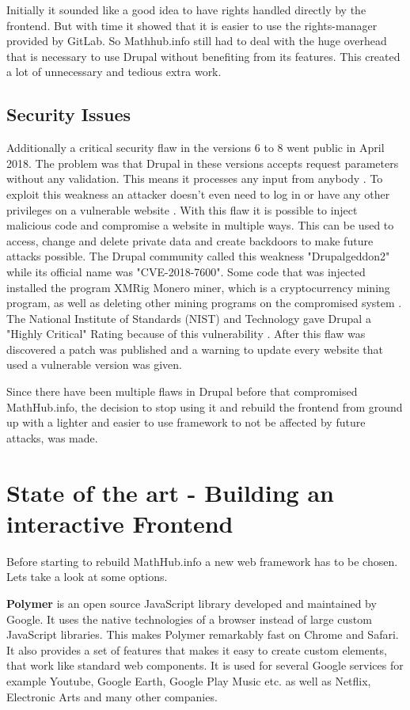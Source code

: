 \documentclass[11pt,a4paper]{article}
\begin{document}
Initially it sounded like a good idea to have rights handled directly by the frontend.
But with time it showed that it is easier to use the rights-manager provided by GitLab.
So Mathhub.info still had to deal with the huge overhead that is necessary to use Drupal without benefiting from its features.
This created a lot of unnecessary and tedious extra work.	

\subsection{Security Issues} \label{security}
Additionally a critical security flaw in the versions 6 to 8 went public in April 2018.
The problem was that Drupal in these versions accepts request parameters without any validation.
This means it processes any input from anybody \cite{zdnet}.
To exploit this weakness an attacker doesn't even need to log in or have any other privileges on a vulnerable website \cite{register}.
With this flaw it is possible to inject malicious code and compromise a website in multiple ways.
This can be used to access, change and delete private data and create backdoors to make future attacks possible.
The Drupal community called this weakness "Drupalgeddon2" while its official name was "CVE-2018-7600".
Some code that was injected installed the program XMRig Monero miner, which is a cryptocurrency mining program, as well as deleting other mining programs on the compromised system \cite{hacker}.
The National Institute of Standards (NIST) and Technology gave Drupal a "Highly Critical" Rating because of this vulnerability \cite{nist}.
 After this flaw was discovered a patch was published and a warning to update every website that used a vulnerable version was given.
	
Since there have been multiple flaws in Drupal before that compromised MathHub.info, the decision to stop using it and rebuild the frontend from ground up with a lighter and easier to use framework to not be affected by future attacks, was made.

\section{State of the art - Building an interactive Frontend} \label{SoA}
Before starting to rebuild MathHub.info a new web framework has to be chosen.
Lets take a look at some options.

\textbf{Polymer} \cite{polymer} is an open source JavaScript library developed and maintained by Google.
It uses the native technologies of a browser instead of large custom JavaScript libraries.
This makes Polymer remarkably fast on Chrome and Safari.
It also provides a set of features that makes it easy to create custom elements, that work like standard web components.
It is used for several Google services for example Youtube, Google Earth, Google Play Music etc. as well as Netflix, Electronic Arts and many other companies. 
\end{document}
